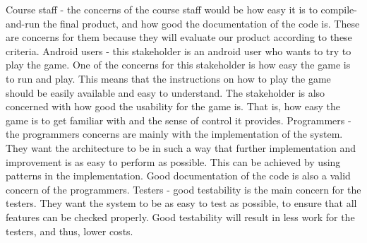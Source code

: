 \label{stakeholders}

Course staff - the concerns of the course staff would be how easy it is to
compile-and-run the final product, and how good the documentation of the code
is. These are concerns for them because they will evaluate our product according
to these criteria.
\newline
\newline
Android users - this stakeholder is an android user who wants to try
to play the game. One of the concerns for this stakeholder is how easy the game is to run and
play. This means that the instructions on how to play the game should be easily
available and easy to understand. The stakeholder is also concerned with how good the usability for the game is. That is, how easy the game is to get familiar with and the sense of control it provides.
\newline
\newline
Programmers - the programmers concerns are mainly with the implementation of the system. They want the architecture to be in such a way that further implementation and improvement is as easy to perform as possible. This can be achieved by using patterns in the implementation. Good documentation of the code is also a valid concern of the programmers.
\newline
\newline
Testers - good testability is the main concern for the testers. They want the system to be as easy to test as possible, to ensure that all features can be checked properly. Good testability will result in less work for the testers, and thus, lower costs.
